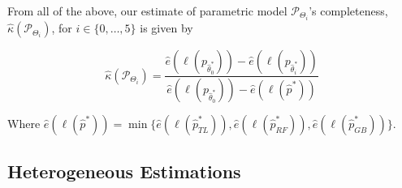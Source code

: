 \documentclass[11pt,a4paper]{article}
\theoremstyle{definition}
\begin{document}
From all of the above, our estimate of parametric model $\mathcal{P}_{\Theta_i}$'s completeness, $\hat{\kappa}(\mathcal{P}_{\Theta_i})$,  for $i\in\{0,\dots, 5\}$ is given by

\begin{equation}
\label{eq:completeness_estim}
\hat{\kappa}(\mathcal{P}_{\Theta_i})=\frac{\hat{e}(\ell(p_{\hat{\theta}^*_0}))-\hat{e}(\ell(p_{\hat{\theta}^*_i}))}{\hat{e}(\ell(p_{\hat{\theta}^*_0}))-\hat{e}(\ell(\hat{p}^*))}
\end{equation}

Where $\hat{e}(\ell(\hat{p}^*))=\min\{\hat{e}(\ell(\hat{p}^*_{TL})),\hat{e}(\ell(\hat{p}^*_{RF})),\hat{e}(\ell(\hat{p}^*_{GB}))\}$.

\subsection{Heterogeneous Estimations}
\label{sec:heterogenous_estimations}
\end{document}

